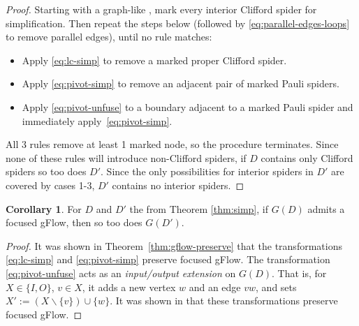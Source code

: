 \documentclass[a4paper,onecolumn,superscriptaddress,11pt,accepted=2020-04-27]{quantumarticle}
\newcommand{\UG}[1]{\ensuremath{G(#1)}\xspace}
\theoremstyle{definition}
\newtheorem{corollary}[theorem]{Corollary}
\newtheorem{proposition}[theorem]{Proposition}
\begin{document}
\begin{proof}
Starting with a graph-like \zxdiagram, mark every interior Clifford spider for simplification. Then repeat the steps below (followed by \eqref{eq:parallel-edges-loops} to remove parallel edges), until no rule matches:
\begin{itemize}
\item Apply \eqref{eq:lc-simp} to remove a marked proper Clifford spider.
\item Apply \eqref{eq:pivot-simp} to remove an adjacent pair of marked Pauli spiders.
\item Apply \eqref{eq:pivot-unfuse} to a boundary adjacent to a marked Pauli spider and immediately apply~\eqref{eq:pivot-simp}.
\end{itemize}
All 3 rules remove at least 1 marked node, so the procedure terminates. Since none of these rules will introduce non-Clifford spiders, if $D$ contains only Clifford spiders so too does $D'$. Since the only possibilities for interior spiders in $D'$ are covered by cases 1-3, $D'$ contains no interior spiders.
\end{proof}

\begin{corollary}\label{cor:simp-preserves-gflow}
For $D$ and $D'$ the \zxdiagrams from Theorem \ref{thm:simp}, if $\UG D$ admits a focused gFlow, then so too does $\UG{D'}$.
\end{corollary}

\begin{proof}
It was shown in Theorem~\ref{thm:gflow-preserve} that the transformations \eqref{eq:lc-simp} and \eqref{eq:pivot-simp} preserve focused gFlow. The transformation \eqref{eq:pivot-unfuse} acts as an \textit{input/output extension} on $\UG D$. That is, for $X \in \{ I, O \}$, $v \in X$, it adds a new vertex $w$ and an edge $vw$, and sets $X' := (X \backslash \{v\}) \cup \{w\}$. It was shown in \cite{mhalla2011graph} that these transformations preserve focused gFlow. 
\end{proof}



\end{document}
